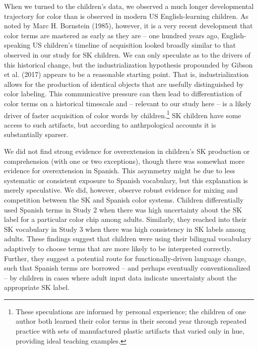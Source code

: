 \documentclass[
  english,
  ,apa7,floatsintext]{apa6}
\begin{document}
When we turned to the children's data, we observed a much longer developmental trajectory for color than is observed in modern US English-learning children. As noted by Marc H. Bornstein (1985), however, it is a very recent development that color terms are mastered as early as they are -- one hundred years ago, English-speaking US children's timeline of acquisition looked broadly similar to that observed in our study for SK children. We can only speculate as to the drivers of this historical change, but the industrialization hypothesis propounded by Gibson et al. (2017) appears to be a reasonable starting point. That is, industrialization allows for the production of identical objects that are usefully distinguished by color labeling. This communicative pressure can then lead to differentiation of color terms on a historical timescale and -- relevant to our study here -- is a likely driver of faster acquisition of color words by children.\footnote{These speculations are informed by personal experience; the children of one author both learned their color terms in their second year through repeated practice with sets of manufactured plastic artifacts that varied only in hue, providing ideal teaching examples.} SK children have some access to such artifacts, but according to anthrpological accounts it is substantially sparser.

We did not find strong evidence for overextension in children's SK production or comprehension (with one or two exceptions), though there was somewhat more evidence for overextension in Spanish. This asymmetry might be due to less systematic or consistent exposure to Spanish vocabulary, but this explanation is merely speculative. We did, however, observe robust evidence for mixing and competition between the SK and Spanish color systems. Children differentially used Spanish terms in Study 2 when there was high uncertainty about the SK label for a particular color chip among adults. Similarly, they reached into their SK vocabulary in Study 3 when there was high consistency in SK labels among adults. These findings suggest that children were using their bilingual vocabulary adaptively to choose terms that are more likely to be interpreted correctly. Further, they suggest a potential route for functionally-driven language change, such that Spanish terms are borrowed -- and perhaps eventually conventionalized -- by children in cases where adult input data indicate uncertainty about the appropriate SK label.
\end{document}
